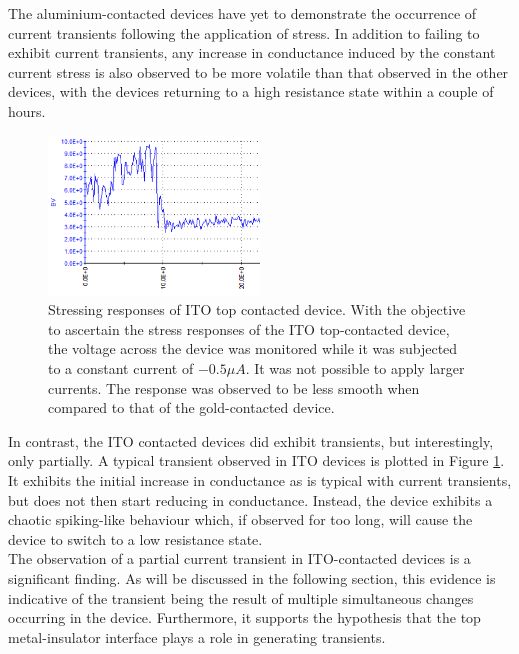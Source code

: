 \noindent The aluminium-contacted devices have yet to demonstrate the occurrence of current transients following the application of stress. In addition to failing to exhibit current transients, any increase in conductance induced by the constant current stress is also observed to be more volatile than that observed in the other devices, with the devices returning to a high resistance state within a couple of hours.\\

\begin{figure}[htbp!] 
\centering    
\includegraphics[width=0.5\textwidth]{Chapter2/Figs/2e.png}
\caption[Stressing responses of ITO top contacted device.]{Stressing responses of ITO top contacted device. With the objective to ascertain the stress responses of the ITO top-contacted device, the voltage across the device was monitored while it was subjected to a constant current of $-0.5\mu A$. It was not possible to apply larger currents. The response was observed to be less smooth when compared to that of the gold-contacted device.}
\label{fig:2e}
\end{figure}

\noindent In contrast, the ITO contacted devices did exhibit transients, but interestingly, only partially. A typical transient observed in ITO devices is plotted in Figure \ref{fig:2e}. It exhibits the initial increase in conductance as is typical with current transients, but does not then start reducing in conductance. Instead, the device exhibits a chaotic spiking-like behaviour which, if observed for too long, will cause the device to switch to a low resistance state.\\

\noindent The observation of a partial current transient in ITO-contacted devices is a significant finding. As will be discussed in the following section, this evidence is indicative of the transient being the result of multiple simultaneous changes occurring in the device. Furthermore, it supports the hypothesis that the top metal-insulator interface plays a role in generating transients.\\

